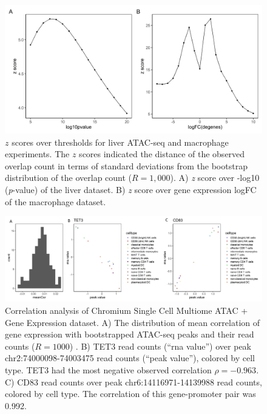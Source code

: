 \documentclass{article}
\begin{document}
\begin{figure}[htbp]
\centering
\includegraphics[scale=0.3]{Figures/zscore.jpeg}
\caption{
  $z$ scores over thresholds for liver ATAC-seq and macrophage experiments.
  The $z$ scores indicated the distance of the observed overlap
  count in terms of standard deviations from the 
  bootstrap distribution of the overlap count ($R = 1,000$).
  A) \textit{z} score over -log10 (\textit{p}-value)  of the liver
  dataset. B) \textit{z} score over gene expression logFC of the
  macrophage dataset.}
\label{fig:suppfig2}
\end{figure}

\begin{figure}[htbp]
\centering
\includegraphics[scale=0.08]{Figures/sfig2.jpeg}
\caption{Correlation analysis of Chromium Single Cell
  Multiome ATAC + Gene Expression dataset. A) The distribution of mean
  correlation of gene expression with bootstrapped
  ATAC-seq peaks and their read counts ($R = 1000$) .
  B) TET3 read counts (``rna value'') over peak
  chr2:74000098-74003475 read counts (``peak value''),
  colored by cell type. TET3 had
  the most negative observed correlation $\rho = −0.963$.
  C) CD83 read
  counts over peak chr6:14116971-14139988 read counts, colored by cell
  type. The correlation of this gene-promoter pair was
  0.992. }
\label{fig:suppfig3}
\end{figure}


%
%
%
%
%
%
%

\end{document}
